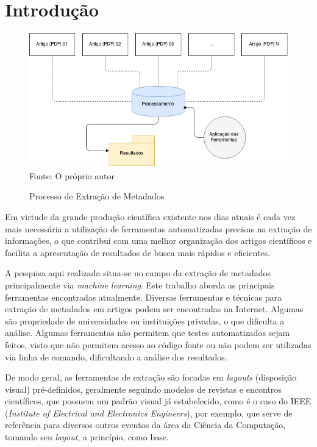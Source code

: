 
\chapter{Introdução}
\label{cha:introduction}


\begin{figure}
	\centering
	\caption{Processo de Extração de Metadados}
	\label{fig:introduction}
	\includegraphics[width=0.9\linewidth]{./assets/images/introduction}
	\center\footnotesize{Fonte: O próprio autor}
\end{figure}



Em virtude da grande produção científica existente nos dias atuais é cada vez mais necessária a utilização de ferramentas automatizadas precisas na extração de informações, o que contribui com uma melhor organização dos artigos científicos e facilita a apresentação de resultados de busca mais rápidos e eficientes.

A pesquisa aqui realizada situa-se no campo da extração de metadados principalmente via \textit{machine learning}. Este trabalho aborda as principais ferramentas encontradas atualmente. Diversas ferramentas e técnicas para extração de metadados em artigos podem ser encontradas na Internet. Algumas são propriedade de universidades ou instituições privadas, o que dificulta a análise. Algumas ferramentas não permitem que testes automatizados sejam feitos, visto que não permitem acesso ao código fonte ou não podem ser utilizadas via linha de comando, dificultando a análise dos resultados.

De modo geral, as ferramentas de extração são focadas em \textit{layouts} (disposição visual) pré-definidos, geralmente seguindo modelos de revistas e encontros científicos, que possuem um padrão visual já estabelecido, como é o caso do IEEE (\textit{Institute of Electrical and Electronics Engineers}), por exemplo, que serve de referência para diversos outros eventos da área da Ciência da Computação, tomando seu \textit{layout}, a princípio, como base.

